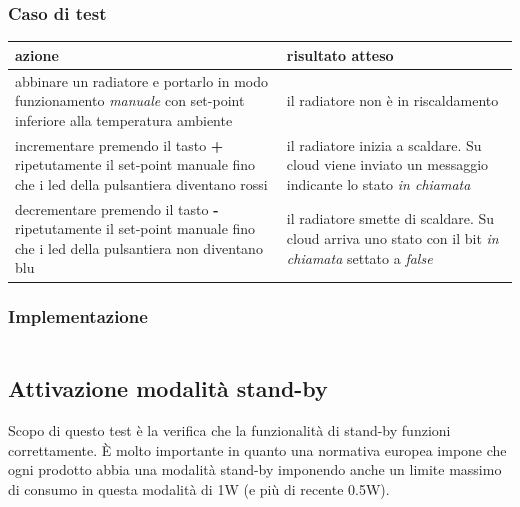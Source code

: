 \documentclass[12pt,a4paper,twoside,titlepage]{book}
\begin{document}
\subsubsection{Caso di test}
\begin{center}
\begin{tabular}{| p{} | p{} |}
    \hline
    \textbf{azione} & \textbf{risultato atteso} \\ \hline
    abbinare un radiatore e portarlo in modo funzionamento \textit{manuale} con set-point inferiore alla temperatura ambiente & il radiatore non è in riscaldamento \\ \hline
    incrementare premendo il tasto \textbf{+} ripetutamente il set-point manuale fino che i \acrshort{led} della pulsantiera diventano rossi & il radiatore inizia a scaldare. Su cloud viene inviato un messaggio indicante lo stato \textit{in chiamata} \\ \hline
    decrementare premendo il tasto \textbf{-} ripetutamente il set-point manuale fino che i \acrshort{led} della pulsantiera non diventano blu & il radiatore smette di scaldare. Su cloud arriva uno stato con il bit \textit{in chiamata} settato a \textit{false} \\ \hline
\end{tabular}
\end{center}

\subsubsection{Implementazione}
\inputminted{python3}{src/test_thermoregulation.py}

\subsection{Attivazione modalità stand-by}
\label{section:test_standby}

Scopo di questo test è la verifica che la funzionalità di stand-by funzioni correttamente.
È molto importante in quanto una normativa europea impone che ogni prodotto abbia una
modalità stand-by imponendo anche un limite massimo di consumo in questa modalità di 1W
(e più di recente 0.5W).
\end{document}
